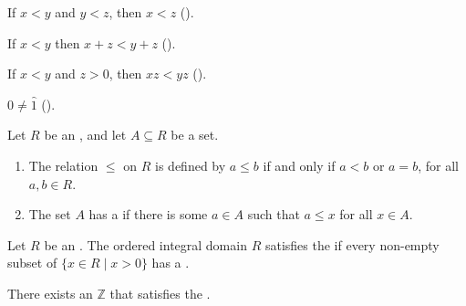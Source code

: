 \begin{definition}
\begin{lenumerate}
		\item {}
		If $x < y$ and $y < z$, then $x < z$ \quad ().
		\item {}
		If $x < y$ then $x + z < y + z$ \quad ().
		\item {}
		If $x < y$ and $z > 0$, then $x z < y z$ \quad ().
		\item {}
		$0 \neq \hat{1}$ \quad ().
	\end{lenumerate}
\end{definition}

\begin{definition} %
	Let $R$ be an , and let $A \subseteq R$ be a set.
	\begin{enumerate}
		\item The relation $\leq$ on $R$ is defined by $a \leq b$ if and only if $a < b$ or $a = b$, for all $a, b \in R$.
		\item {}
		      The set $A$ has a \emph{} if there is some $a \in A$ such that $a \leq x$ for all $x \in A$.
	\end{enumerate}
\end{definition}

\begin{definition} %
	Let $R$ be an . The ordered integral domain $R$ satisfies the \emph{} if every non-empty subset of $\{x \in R \mid x > 0 \}$
	has a .
\end{definition}

\begin{axiom}  %
	There exists an  $\mathbb{Z}$ that satisfies the .
\end{axiom}

